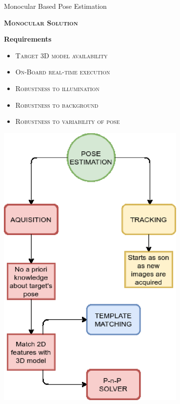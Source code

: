 \documentclass[10pt]{beamer}
\begin{document}
\begin{frame}{Monocular Based Pose Estimation}

  \bigskip

  \textsc{\textbf{\large Monocular Solution}}

  \bigskip

  \begin{overlayarea}{\textwidth}{0.8\textheight}
    \begin{minipage}{0.53\textwidth}
      \textbf{{Requirements}}
      \bigskip
      \hspace{1.0cm}

      \begin{itemize}
        \item\textsc{Target 3D model availability}
              \smallskip
        \item\textsc{On-Board real-time execution}
              \smallskip
        \item\textsc{Robustness to illumination}
              \smallskip
        \item\textsc{Robustness to background}
              \smallskip
        \item\textsc{Robustness to variability of pose}
              \smallskip
      \end{itemize}
    \end{minipage}
    \hfill
    \begin{minipage}{0.44\textwidth}
      \vspace{-0.2cm}
      \hspace{0.5cm}
      \includegraphics[width=0.7\textwidth]{gfx/statoArtePose.eps}
    \end{minipage}
    \hfill
  \end{overlayarea}

\end{frame}
\end{document}
